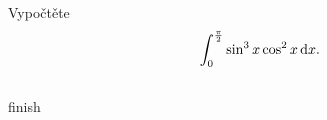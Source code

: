 \documentclass[12pt]{article}
\begin{document}
    \subsection{}
    \begin{tcolorbox}
        Vypočtěte
        $$ \int_{0}^{\frac{\pi}{2}} \sin^3{x}\cos^2{x} \mathop{}\!\mathrm{d}{x} . $$
    \end{tcolorbox}
    
    \pagebreak

    \subsection{}
    \begin{tcolorbox}
        finish
    \end{tcolorbox}
\end{document}

